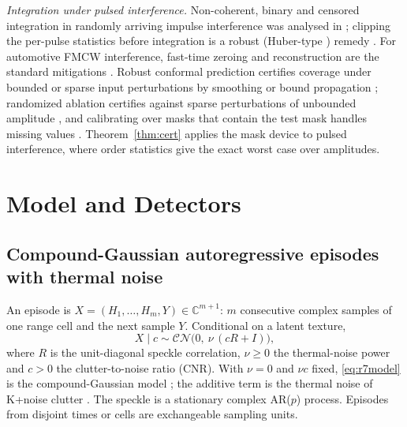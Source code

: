 \documentclass[journal]{IEEEtran}
\begin{document}
\emph{Integration under pulsed interference.} Non-coherent, binary and censored integration in randomly arriving impulse interference was analysed in \cite{himonas1994api}; clipping the per-pulse statistics before integration is a robust (Huber-type \cite{huber1965robust}) remedy \cite{abbasi2018clip}. For automotive FMCW interference, fast-time zeroing and reconstruction are the standard mitigations \cite{toth2019comp,rameez2021ar}. Robust conformal prediction certifies coverage under bounded or sparse input perturbations by smoothing or bound propagation \cite{gendler2022arcp,jeary2024vrcp,zargarbashi2024robust}; randomized ablation certifies against sparse perturbations of unbounded amplitude \cite{levine2020ablation}, and calibrating over masks that contain the test mask handles missing values \cite{zaffran2023missing}. Theorem~\ref{thm:cert} applies the mask device to pulsed interference, where order statistics give the exact worst case over amplitudes.

\section{Model and Detectors}\label{sec:model}
\subsection{Compound-Gaussian autoregressive episodes with thermal noise}
An episode is $X=(H_1,\dots,H_m,Y)\in\mathbb{C}^{m+1}$: $m$ consecutive complex samples of one range cell and the next sample $Y$. Conditional on a latent texture,
\begin{equation}
X\mid c\sim\mathcal{CN}\big(0,\ \nu\,(cR+I)\big),
\label{eq:r7model}
\end{equation}
where $R$ is the unit-diagonal speckle correlation, $\nu\ge0$ the thermal-noise power and $c>0$ the clutter-to-noise ratio (CNR). With $\nu=0$ and $\nu c$ fixed, \eqref{eq:r7model} is the compound-Gaussian model \cite{conte1995,ollila2012}; the additive term is the thermal noise of K+noise clutter \cite{watts1987,ward2013}. The speckle is a stationary complex AR($p$) process. Episodes from disjoint times or cells are exchangeable sampling units.
\end{document}
